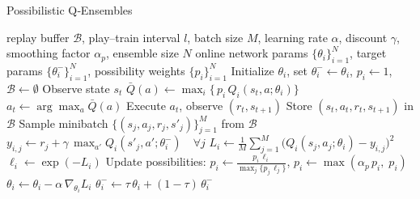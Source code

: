 \documentclass[11pt,a4paper]{report}
\begin{document}
\begin{algorithm}[ht]
\caption{Possibilistic Q‐Ensembles}
\label{alg:poss_q_ensembles}
\begin{algorithmic}[1]
\Require replay buffer $\mathcal B$, play–train interval $l$,  batch size $M$, learning rate $\alpha$, discount $\gamma$, smoothing factor $\alpha_p$, ensemble size $N$
\Ensure online network params $\{\theta_i\}_{i=1}^N$, target params $\{\theta^-_i\}_{i=1}^N$, possibility weights $\{p_i\}_{i=1}^N$
\State Initialize $\theta_i$, set $\theta^-_i\gets\theta_i$, $p_i\gets1$, $\mathcal B\gets\emptyset$
  \State Observe state $s_t$
  \State $\bar Q(a)\gets \max_{i}\{\,p_i\,Q_i(s_t,a;\theta_i)\}$
  \State $a_t\gets \arg\max_a \bar Q(a)$
  \State Execute $a_t$, observe $(r_t,s_{t+1})$
  \State Store $(s_t,a_t,r_t,s_{t+1})$ in $\mathcal B$
    \State Sample minibatch $\{(s_j,a_j,r_j,s'_j)\}_{j=1}^M$ from $\mathcal B$
      \State $y_{i,j}\gets r_j + \gamma\,\max_{a'}Q_i(s'_j,a';\theta^-_i)\quad\forall j$
      \State $L_i\gets \frac{1}{M}\sum_{j=1}^M\bigl(Q_i(s_j,a_j;\theta_i)-y_{i,j}\bigr)^2$
      \State $\ell_i\gets \exp(-L_i)$
    \EndFor
    \State Update possibilities:
      $p_i\gets \frac{p_i\,\ell_i}{\max_j\{p_j\,\ell_j\}}$, 
      $p_i\gets \max(\alpha_p\,p_i,\;p_i)$
      \State $\theta_i\gets \theta_i - \alpha\,\nabla_{\theta_i}L_i$
      \State $\theta_i^- \gets \tau\,\theta_i + (1 - \tau)\,\theta_i^-$
    \EndFor
  \EndIf
\EndFor
\end{algorithmic}
\end{algorithm}
\end{document}
